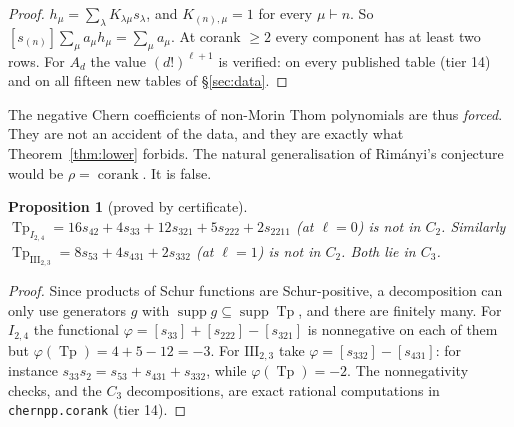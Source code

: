 \documentclass[11pt,a4paper]{article}
\DeclareMathOperator{\Tp}{Tp}
\DeclareMathOperator{\supp}{supp}
\theoremstyle{plain}
\newtheorem{proposition}[theorem]{Proposition}
\theoremstyle{definition}
\theoremstyle{remark}
\begin{document}
\begin{proof}
$h_\mu = \sum_\lambda K_{\lambda\mu} s_\lambda$, and $K_{(n),\mu} = 1$ for every $\mu \vdash n$. So
$[s_{(n)}] \sum_\mu a_\mu h_\mu = \sum_\mu a_\mu$. At corank $\ge 2$ every component has at least two
rows. For $A_d$ the value $(d!)^{\ell+1}$ is verified: on every published table (tier 14)
and on all fifteen new tables of \S\ref{sec:data}.
\end{proof}

The negative Chern coefficients of non-Morin Thom polynomials are thus \emph{forced}. They are not
an accident of the data, and they are exactly what Theorem~\ref{thm:lower} forbids. The natural
generalisation of Rim\'anyi's conjecture would be $\rho = \operatorname{corank}$. It is false.

\begin{proposition}[proved by certificate]\label{prop:i24}
$\Tp_{I_{2,4}} = 16 s_{42} + 4 s_{33} + 12 s_{321} + 5 s_{222} + 2 s_{2211}$ (at $\ell = 0$) is not in
$C_2$. Similarly $\Tp_{\mathrm{III}_{2,3}} = 8 s_{53} + 4 s_{431} + 2 s_{332}$ (at $\ell = 1$) is
not in $C_2$. Both lie in $C_3$.
\end{proposition}

\begin{proof}
Since products of Schur functions are Schur-positive, a decomposition can only use generators $g$
with $\supp g \subseteq \supp \Tp$, and there are finitely many. For $I_{2,4}$ the functional
$\varphi = [s_{33}] + [s_{222}] - [s_{321}]$ is nonnegative on each of them but
$\varphi(\Tp) = 4 + 5 - 12 = -3$. For $\mathrm{III}_{2,3}$ take $\varphi = [s_{332}] - [s_{431}]$:
for instance $s_{33}s_{2} = s_{53} + s_{431} + s_{332}$, while $\varphi(\Tp) = -2$. The
nonnegativity checks, and the $C_3$ decompositions, are exact rational computations in
\texttt{chernpp.corank} (tier 14).
\end{proof}
\end{document}

